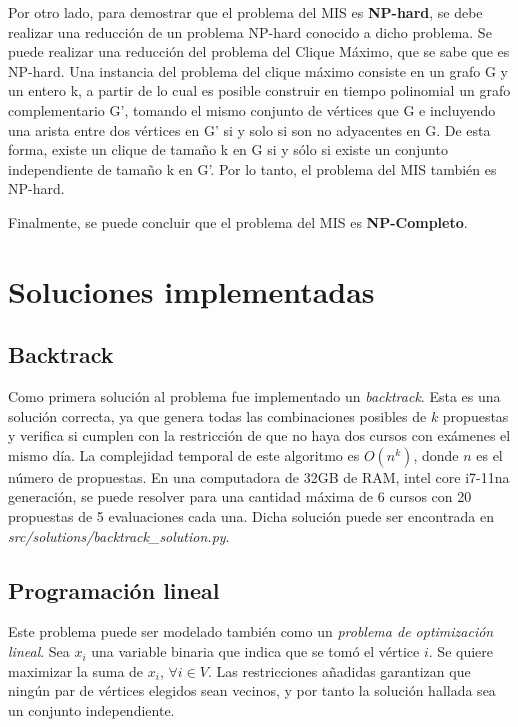 \documentclass[10pt]{article} %
\begin{document}
	Por otro lado, para demostrar que el problema del MIS es \textbf{NP-hard}, se debe realizar una reducción de un problema NP-hard conocido a dicho problema. Se puede realizar una reducción del problema del Clique M\'aximo, que se sabe que es NP-hard. 
	Una instancia del problema del clique m\'aximo consiste en un grafo G y un entero k, a partir de lo cual es posible construir en tiempo polinomial un grafo complementario G', tomando el mismo conjunto de vértices que G e incluyendo una arista entre dos vértices en G' si y solo si son no adyacentes en G. De esta forma, existe un clique de tamaño k en G si y sólo si existe un conjunto independiente de tamaño k en G'. Por lo tanto, el problema del MIS también es NP-hard.

	Finalmente, se puede concluir que el problema del MIS es \textbf{NP-Completo}.
	
	\section{Soluciones implementadas}
	
	\subsection{Backtrack}
	
		Como primera solución al problema fue implementado un \textit{backtrack}. Esta es una solución correcta, ya que  genera todas las combinaciones posibles de $k$ propuestas y verifica si cumplen con la restricción de que no haya dos cursos con exámenes el mismo día. La complejidad temporal de este algoritmo es $O(n^k)$, donde $n$ es el número de propuestas. En una computadora de 32GB de RAM, intel core i7-11na generación, se puede resolver para una cantidad máxima de 6 cursos con 20 propuestas de 5 evaluaciones cada una. Dicha solución puede ser encontrada en \textit{src/solutions/backtrack\_solution.py}.
		
	\subsection{Programaci\'on lineal}
	
	Este problema puede ser modelado tambi\'en como un \textit{problema de optimizaci\'on lineal}. Sea $ x_{i} $ una variable binaria que indica que se tom\'o el v\'ertice $ i $. Se quiere maximizar la suma de $ x_i$,  $\forall i \in V $. Las restricciones a\~nadidas  garantizan que ning\'un par de v\'ertices elegidos sean vecinos, y por tanto la soluci\'on hallada sea un conjunto independiente. 
		
\end{document}
